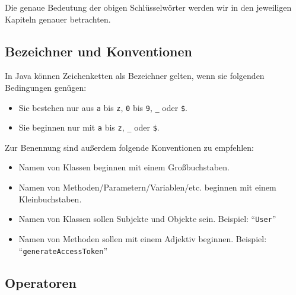 	Die genaue Bedeutung der obigen Schlüsselwörter werden wir in den jeweiligen Kapiteln genauer betrachten.

\subsection{Bezeichner und Konventionen}
	
	In Java können Zeichenketten als Bezeichner gelten, wenn sie folgenden Bedingungen genügen:
	\begin{itemize}
		\item Sie bestehen nur aus \texttt{a} bis \texttt{z}, \texttt{0} bis \texttt{9}, \texttt{\_} oder \texttt{\$}.
		\item Sie beginnen nur mit \texttt{a} bis \texttt{z}, \texttt{\_} oder \texttt{\$}.
	\end{itemize}
	
	Zur Benennung sind außerdem folgende Konventionen zu empfehlen:
	\begin{itemize}
		\item Namen von Klassen beginnen mit einem Großbuchstaben.
		\item Namen von Methoden/Parametern/Variablen/etc. beginnen mit einem Kleinbuchstaben.
		\item Namen von Klassen sollen Subjekte und Objekte sein. Beispiel: \enquote{\texttt{User}}
		\item Namen von Methoden sollen mit einem Adjektiv beginnen. Beispiel: \enquote{\texttt{generateAccessToken}}
	\end{itemize}
	

\subsection{Operatoren}
	
